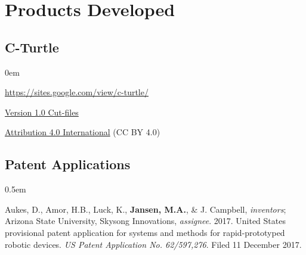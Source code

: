 \documentclass[12pt,a4paper]{article}
\begin{document}
\section*{Products Developed}
	\subsection*{C-Turtle}
		\begin{description}
			\itemsep0em
			\item[Website] \href{https://sites.google.com/view/c-turtle/}{https://sites.google.com/view/c-turtle/}
			\item[Design] \href{https://drive.google.com/file/d/0BxntR7XVPIVqekR3Sjcyd1hkUm8/view}{Version 1.0 Cut-files}
			\item[License] \href{https://creativecommons.org/licenses/by/4.0/}{Attribution 4.0 International} (CC BY 4.0)
		\end{description}

	\subsection*{Patent Applications}
		\begin{description}
			\itemsep0.5em
			\item Aukes, D., Amor, H.B., Luck, K., \textbf{Jansen, M.A.}, \& J. Campbell, \textit{inventors}; Arizona State University, Skysong Innovations, \textit{assignee}. 2017. United States provisional patent application for systems and methods for rapid-prototyped robotic devices. \textit{US Patent Application No. 62/597,276}. Filed 11 December 2017.
		\end{description}
\end{document}
